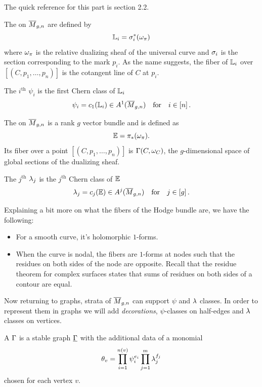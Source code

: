 \documentclass[12pt]{memoir}
\begin{document}
The quick reference for this part is \cite{cavalieri2022pseudostablehodgeintegrals} section 2.2. 

\begin{Def}
    The  on $\overline M_{g,n}$ are defined by 
    $$\mathbb{L}_i=\sigma_i^\ast(\omega_\pi)$$
    where $\omega_\pi$ is the relative dualizing sheaf of the universal curve and $\sigma_i$ is the section corresponding to the mark $p_i$. As the name suggests, the fiber of $\mathbb{L}_i$ over $[(C,p_1,\dots,p_n)]$ is the cotangent line of $C$ at $p_i$.\par
    The $i^{\text{th}}$  $\psi_i$ is the first Chern class of $\mathbb{L}_i$
    $$\psi_i=c_1(\mathbb{L}_i)\in A^1(\overline M_{g,n})\quad\text{for}\quad i\in\left\lbrack n\right\rbrack.$$
\end{Def}

\begin{Def}
    The  on $\overline M_{g,n}$ is a rank $g$ vector bundle and is defined as 
    $$\mathbb{E}=\pi_\ast(\omega_\pi).$$
    Its fiber over a point $[(C,p_1,\dots,p_n)]$ is $\Gamma(C,\omega_C)$, the $g$-dimensional space of global sections of the dualizing sheaf.\par
    The $j^{\text{th}}$  $\lambda_j$ is the $j^{\text{th}}$ Chern class of $\mathbb{E}$
    $$\lambda_j=c_j(\mathbb{E})\in A^j(\overline M_{g,n})\quad\text{for}\quad j\in\left\lbrack g\right\rbrack.$$
\end{Def}

\begin{Rmk}
    Explaining a bit more on what the fibers of the Hodge bundle are, we have the following:
    \begin{itemize}
        \item For a smooth curve, it's holomorphic $1$-forms.
        \item When the curve is nodal, the fibers are $1$-forms at nodes such that the residues on both sides of the node are opposite. Recall that the residue theorem for complex surfaces states that sums of residues on both sides of a contour are equal.
    \end{itemize}
\end{Rmk}

Now returning to graphs, strata of $\overline M_{g,n}$ can support $\psi$ and $\lambda$ classes. In order to represent them in graphs we will add \emph{decorations}, $\psi$-classes on half-edges and $\lambda$ classes on vertices. 

\begin{Def}
    A  $\Gamma$ is a stable graph $\underline{\Gamma}$ with the additional data of a monomial 
    $$\theta_v=\prod_{i=1}^{n(v)}\psi^{e_i}_i\prod_{j=1}^{m}\lambda^{f_j}_j$$
    chosen for each vertex $v$.
\end{Def}
\end{document}
